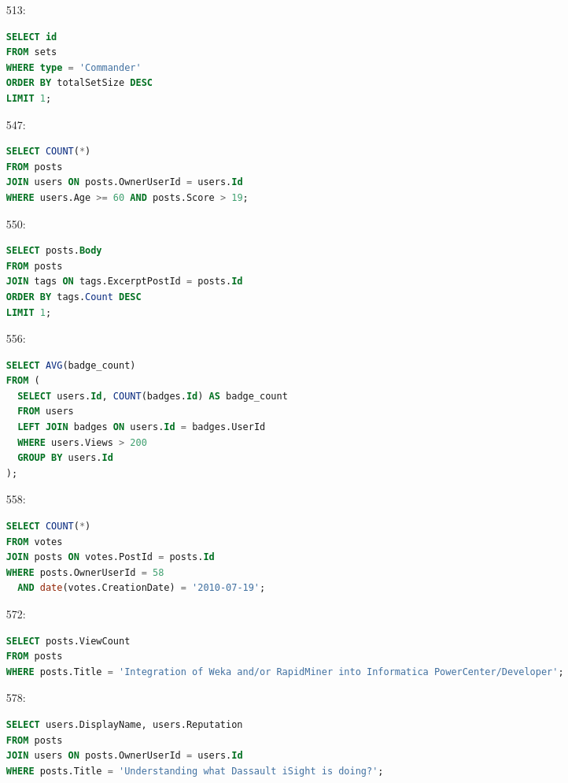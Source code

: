 \documentclass[11pt]{article}
\begin{document}
\begin{enumerate}
\item[513:]
\begin{lstlisting}[language=SQL]
SELECT id
FROM sets
WHERE type = 'Commander'
ORDER BY totalSetSize DESC
LIMIT 1;
\end{lstlisting}

\item[547:]
\begin{lstlisting}[language=SQL]
SELECT COUNT(*)
FROM posts
JOIN users ON posts.OwnerUserId = users.Id
WHERE users.Age >= 60 AND posts.Score > 19;
\end{lstlisting}

\item[550:]
\begin{lstlisting}[language=SQL]
SELECT posts.Body
FROM posts
JOIN tags ON tags.ExcerptPostId = posts.Id
ORDER BY tags.Count DESC
LIMIT 1;
\end{lstlisting}

\item[556:]
\begin{lstlisting}[language=SQL]
SELECT AVG(badge_count)
FROM (
  SELECT users.Id, COUNT(badges.Id) AS badge_count
  FROM users
  LEFT JOIN badges ON users.Id = badges.UserId
  WHERE users.Views > 200
  GROUP BY users.Id
);
\end{lstlisting}

\item[558:]
\begin{lstlisting}[language=SQL]
SELECT COUNT(*)
FROM votes
JOIN posts ON votes.PostId = posts.Id
WHERE posts.OwnerUserId = 58
  AND date(votes.CreationDate) = '2010-07-19';
\end{lstlisting}

\item[572:]
\begin{adjustbox}{max width=\textwidth}
\begin{lstlisting}[language=SQL]
SELECT posts.ViewCount
FROM posts
WHERE posts.Title = 'Integration of Weka and/or RapidMiner into Informatica PowerCenter/Developer';
\end{lstlisting}
\end{adjustbox}

\item[578:]
\begin{lstlisting}[language=SQL]
SELECT users.DisplayName, users.Reputation
FROM posts
JOIN users ON posts.OwnerUserId = users.Id
WHERE posts.Title = 'Understanding what Dassault iSight is doing?';
\end{lstlisting}


\end{enumerate}
\end{document}

